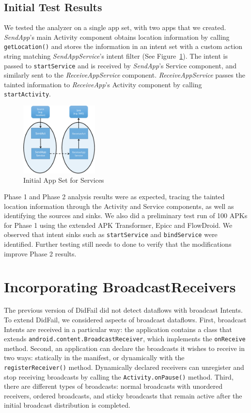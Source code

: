 \subsection{Initial Test Results}
We tested the analyzer on a single app set, with two apps that we created. \emph{SendApp}'s main Activity component obtains location information by calling \texttt{getLocation()} and stores the information in an intent set with a custom action string matching \emph{SendAppService}'s intent filter (See Figure~\ref{fig:servicetest1}). The intent is passed to \texttt{startService} and is received by \emph{SendApp}'s Service component, and similarly sent to the \emph{ReceiveAppService} component. \emph{ReceiveAppService} passes the tainted information to \emph{ReceiveApp}'s Activity component by calling \texttt{startActivity}.

\begin{figure}[h]
	\centering
	\includegraphics[width=0.35\textwidth]{serviceapp.pdf}
	\caption{Initial App Set for Services}
	\label{fig:servicetest1}
\end{figure}

Phase 1 and Phase 2 analysis results were as expected, tracing the tainted location information through the Activity and Service components, as well as identifying the sources and sinks. We also did a preliminary test run of 100 APKs for Phase 1 using the extended APK Transformer, Epicc and FlowDroid. We observed that intent sinks such as \texttt{startService} and \texttt{bindService} were identified. Further testing still needs to done to verify that the modifications improve Phase 2 results.

\section{Incorporating BroadcastReceivers}
The previous version of DidFail did not detect dataflows with broadcast Intents. To extend DidFail, we considered aspects of broadcast dataflows. First, broadcast Intents are received in a particular way: the application contains a class that extends \texttt{android.content.BroadcastReceiver}, which implements the \texttt{onReceive} method. Second, an application can declare the broadcasts it wishes to receive in two ways: statically in the manifest, or dynamically with the \texttt{registerReceiver()} method. Dynamically declared receivers can unregister and stop receiving broadcasts by calling the \texttt{Activity.onPause()} method. Third, there are different types of broadcasts: normal broadcasts with unordered receivers, ordered broadcasts, and sticky broadcasts that remain active after the initial broadcast distribution is completed.


